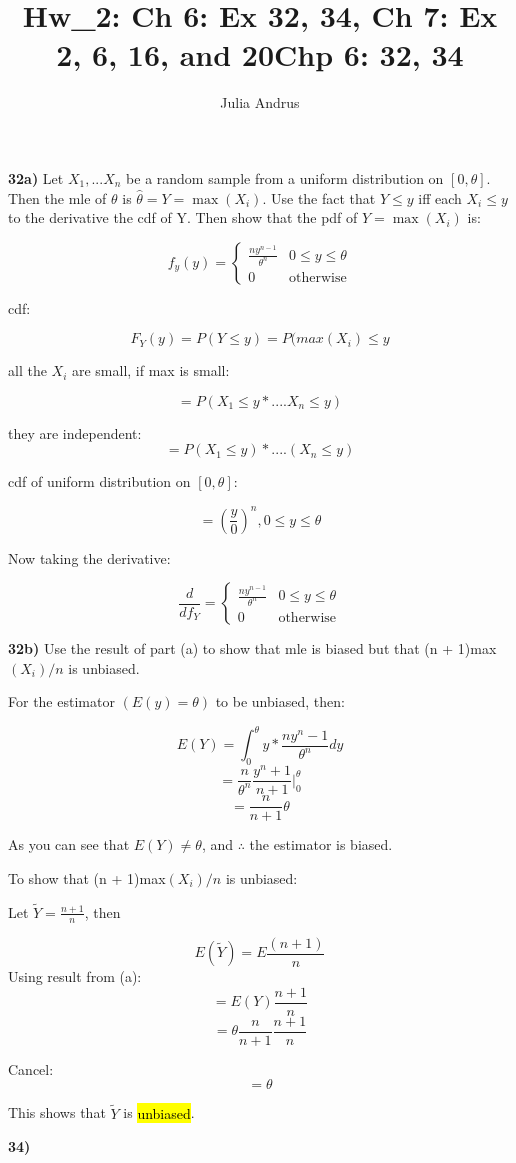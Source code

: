 \documentclass{article}
\title{Hw\_2: Ch 6: Ex 32, 34, Ch 7: Ex 2, 6, 16, and 20}
\author{Julia Andrus}
\date{}
\begin{document}
\maketitle

\title{\textbf{Chp 6: 32, 34}}

\vspace{2mm}

\textbf{32a)} Let $X_{1},...X_{n}$ be a random sample from a uniform distribution on $[0,\theta]$. Then the mle of       $\theta$ is $\hat{\theta}=Y=\max(X_{i})$. Use the fact that $Y \le y$ iff each $X_{i} \le y$ to the derivative the cdf of Y. Then show that the pdf of $Y=\max(X_{i})$ is: 

 $$f_{y}(y)=
\begin{cases}
 \frac{ny^{n-1}}{\theta^{n}} & 0\le y \le \theta \\
 0 & \text{otherwise} 
\end{cases}$$ 

cdf:

$$F_{Y}(y)=P(Y \le y)=P(max(X_{i}) \le y$$

all the $X_{i}$ are small, if max is small:

$$=P(X_{1} \le y *....X_{n} \le y)$$

they are independent:
$$=P(X_{1} \le y) *....(X_{n} \le y)$$

cdf of uniform distribution on $[0,\theta]$:

$$=(\frac{y}{0})^{n},  0\le y \le \theta$$

Now taking the derivative:

$$\frac{d}{df_{Y}}=
\begin{cases}
 \frac{ny^{n-1}}{\theta^{n}} & 0\le y \le \theta \\
 0 & \text{otherwise} 
\end{cases}$$ 


\newpage


\textbf{32b)} Use the result of part (a) to show that mle is biased but that (n + 1)max$(X_{i})/n$ is unbiased.

For the estimator $(E(y)=\theta)$ to be unbiased, then: 

$$E(Y)=\int_{0}^{\theta} y * \frac{ny^n-1}{\theta^n} dy$$
$$=\frac{n}{\theta^n}\frac{y^n+1}{n+1}|_{0}^{\theta}$$
$$=\frac{n}{n+1}\theta$$

As you can see that $E(Y) \neq \theta$, and $\therefore$ the estimator is biased.

\vspace{3mm}

To show that (n + 1)max$(X_{i})/n$ is unbiased:

Let $\tilde{Y}=\frac{n+1}{n}$, then

$$E(\tilde{Y})=E\frac{(n+1)}{n}$$
Using result from (a):
$$=E(Y)\frac{n+1}{n}$$
$$=\theta \frac{n}{n+1}\frac{n+1}{n}$$

Cancel:
$$=\theta$$

This shows that $\tilde{Y}$ is \hl{unbiased}.







\newpage


\textbf{34)}
\end{document}
